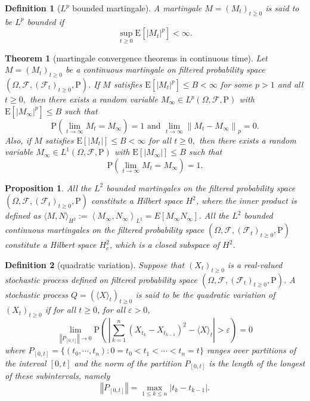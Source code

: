 \documentclass{article}
\newtheorem{definition}{Definition}[section]
\newtheorem{proposition}{Proposition}[section]
\newtheorem{theorem}{Theorem}[section]
\theoremstyle{nonumberplain}
\begin{document}
\begin{definition}[$L^p$ bounded martingale]
	A martingale $M=(M_t)_{t\ge0}$ is said to be $L^p$ \emph{bounded} if 
	$$
	\sup _{t \geq 0} \mathrm{E}\left[|M_{t}|^{p}\right]<\infty.
	$$
\end{definition}


\begin{theorem}[martingale convergence theorems in continuous time] Let $M=(M_{t})_{t\ge0}$ be a continuous martingale on filtered probability space $(\Omega,\mathcal{F},(\mathcal{F}_{t})_{t\ge0},\mathrm{P})$. If $M$ satisfies $\mathrm{E}\left[\left|M_{t}\right|^{p}\right] \leq B<\infty$ for some $p>1$ and all $t \geq 0,$ then there exists a random variable $M_{\infty}\in L^p(\Omega,\mathcal{F},\mathrm{P})$ with $\mathrm{E}\left[\left|M_{\infty}\right|^p\right] \leq B$ such that
\[
\mathrm{P}\left(\lim _{t \rightarrow \infty} M_{t}=M_{\infty}\right)=1 \text { and } \lim _{t \rightarrow \infty}\left\|M_{t}-M_{\infty}\right\|_{p}=0.
\]
Also, if $M$ satisfies $\mathrm{E}\left[\left|M_{t}\right|\right]\le B<\infty$ for all $t \ge 0,$ then there exists a random variable $M_{\infty}\in L^1(\Omega,\mathcal{F},\mathrm{P})$ with $\mathrm{E}\left[\left|M_{\infty}\right|\right] \leq B$ such that
\[
\mathrm{P}\left(\lim _{t \rightarrow \infty} M_{t}=M_{\infty}\right)=1.
\]
\end{theorem}
\begin{proposition}
All the $L^2$ bounded martingales on the filtered probability space $(\Omega,\mathcal{F},(\mathcal{F}_{t})_{t\ge0},\mathrm{P})$ constitute a Hilbert space $H^2$, where the inner product is defined as $\langle M, N\rangle_{H^{2}}:=\left\langle M_{\infty}, N_{\infty}\right\rangle_{L^{2}}=E\left[M_{\infty} N_{\infty}\right]$. All the $L^2$ bounded continuous martingales on the filtered probability space $(\Omega,\mathcal{F},(\mathcal{F}_{t})_{t\ge0},\mathrm{P})$ constitute a Hilbert space $H^2_c$, which is a closed subspace of $H^2$.
\end{proposition}

\begin{definition}[quadratic variation]	
		Suppose that $(X_t)_{t\ge 0}$ is a real-valued stochastic process defined on filtered probability space $(\Omega,\mathcal{F},(\mathcal{F}_{t})_{t\ge0},\mathrm{P})$. A stochastic process $Q=(\langle X\rangle_{t})_{t\ge0}$ is said to be the \emph{quadratic variation} of $(X_t)_{t\ge 0}$ if for all $t\ge0$, for all $\varepsilon>0$,
	\[
	\lim_{\left\Vert P_{[0,t]}\right\Vert \rightarrow 0}\mathrm{P}\left(\,\left|\sum _{k=1}^{n}(X_{t_{k}}-X_{t_{k-1}})^{2}-\langle X\rangle_{t}\right|>\varepsilon\right)=0
	\] 
	where $P_{[0,t]}=\{(t_0,\cdots,t_n):0=t_0<t_1<\cdots<t_n=t\}$ ranges over partitions of the interval $[0,t]$ and the norm of the partition $P_{[0,t]}$ is the length of the longest of these subintervals, namely
	\[
	\left\Vert P_{[0,t]}\right\Vert=\max\limits_{1\le k\le n}{|t_k-t_{k-1}|}.
	\]
\end{definition}
\end{document}
